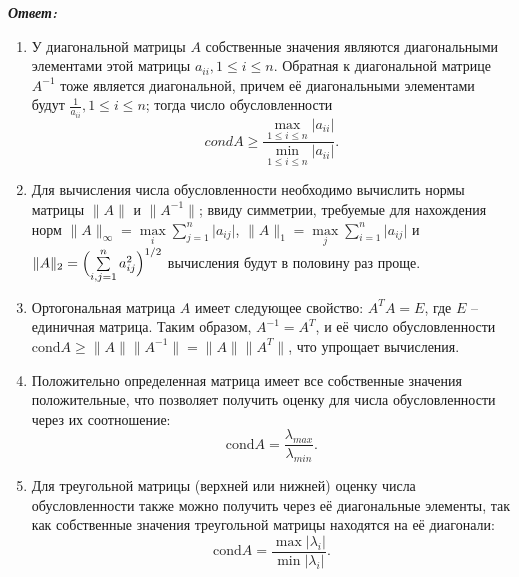 \documentclass[12pt, a4paper]{article}
\newcommand{\norm}[1]{\lVert #1 \rVert}
\newcommand{\abs}[1]{\lvert #1 \rvert}
\begin{document}
\begin{enumerate}
		\vspace*{0.2cm}
		\textit{\textbf{Ответ:}}
		
		\begin{enumerate}
			\item У диагональной матрицы $A$ собственные значения являются диагональными элементами этой матрицы $a_{ii}, 1 \leq i \leq n$. Обратная к диагональной матрице $A^{-1}$ тоже является диагональной, причем её диагональными элементами будут $\frac{1}{a_{ii}}, 1 \leq i \leq n$; тогда число обусловленности 
			\begin{equation*}
				cond A \geq \frac{ \max\limits_{1 \leq i \leq n} \lvert a_{ii}\rvert }{\min\limits_{1 \leq i \leq n} \lvert a_{ii} \rvert}.
			\end{equation*}
			
			\item Для вычисления числа обусловленности необходимо вычислить нормы матрицы $\lVert {A} \rVert$ и $\lVert A^{-1} \rVert$; ввиду симметрии, требуемые для нахождения норм $\norm{A}_{\infty} = \max\limits_i \sum\limits_{j=1}^n \abs{a_{ij}}$, $\norm{A}_1 = \max\limits_j \sum\limits_{i=1}^n \abs{a_{ij}}$ и $ \norm{A}_2 = \Bigl ( \sum\limits_{i,j=1}^{n} a_{ij}^2 \Bigr)^{1/2}$ вычисления будут в половину раз проще.
			
			\item Ортогональная матрица $A$ имеет следующее свойство: $A^T A= E$, где $E$ -- единичная матрица. Таким образом, $A^{-1} = A^T$, и её число обусловленности $\text{cond} A \geq \norm{A} \norm{A^{-1}} = \norm{A} \norm{A^{T}}$, что упрощает вычисления.
			
			\item Положительно определенная матрица имеет все собственные значения положительные, что позволяет получить оценку для числа обусловленности через их соотношение:
			\begin{equation*}
				\text{cond} A = \frac{\lambda_{max}}{\lambda_{min}}.
			\end{equation*}
			
			\item Для треугольной матрицы (верхней или нижней) оценку числа обусловленности также можно получить через её диагональные элементы, так как собственные значения треугольной матрицы находятся на её диагонали:
			\begin{equation*}
				\text{cond} A = \frac{\max {\abs{\lambda_i}}}{ \min \abs{{\lambda_i}} }.
			\end{equation*}
			
			
		\end{enumerate}
		

\end{enumerate}
\end{document}
